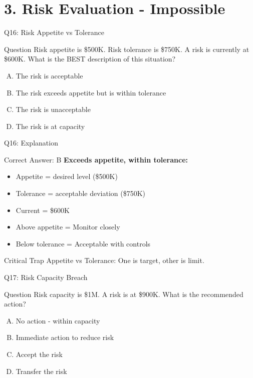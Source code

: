 \documentclass{beamer}
\begin{document}
			
			\section{3. Risk Evaluation - Impossible}
			
			\begin{frame}{Q16: Risk Appetite vs Tolerance}
				\begin{block}{Question}
					Risk appetite is \$500K. Risk tolerance is \$750K. A risk is currently at \$600K. What is the BEST description of this situation?
				\end{block}
				\begin{enumerate}[(A)]
					\item The risk is acceptable
					\item The risk exceeds appetite but is within tolerance
					\item The risk is unacceptable
					\item The risk is at capacity
				\end{enumerate}
			\end{frame}
			
			\begin{frame}{Q16: Explanation}
				\begin{block}{Correct Answer: B}
					\textbf{Exceeds appetite, within tolerance:}
					\begin{itemize}
						\item Appetite = desired level (\$500K)
						\item Tolerance = acceptable deviation (\$750K)
						\item Current = \$600K
						\item Above appetite = Monitor closely
						\item Below tolerance = Acceptable with controls
					\end{itemize}
				\end{block}
				\begin{alertblock}{Critical Trap}
					Appetite vs Tolerance: One is target, other is limit.
				\end{alertblock}
			\end{frame}
			
			\begin{frame}{Q17: Risk Capacity Breach}
				\begin{block}{Question}
					Risk capacity is \$1M. A risk is at \$900K. What is the recommended action?
				\end{block}
				\begin{enumerate}[(A)]
					\item No action - within capacity
					\item Immediate action to reduce risk
					\item Accept the risk
					\item Transfer the risk
				\end{enumerate}
			\end{frame}
			
\end{document}
